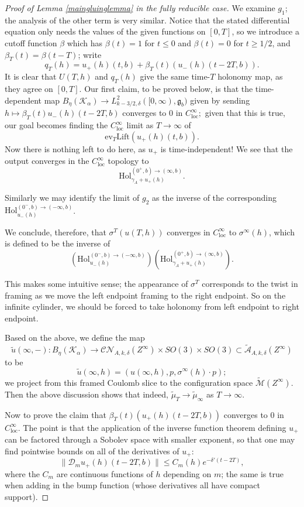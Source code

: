 \documentclass{memo-l}
\theoremstyle{definition}
\theoremstyle{remark}
\numberwithin{section}{chapter}
\numberwithin{equation}{chapter}
\begin{document}
\begin{proof}[Proof of Lemma \ref{maingluinglemma} in the fully reducible case]
We examine $g_1$; the analysis of the other term is very similar. Notice that the stated differential equation only needs the values of the given functions on $[0,T]$, so we introduce a cutoff function $\beta$ which has $\beta(t) = 1$ for $t \leq 0$ and $\beta(t) = 0$ for $t \geq 1/2$, and $\beta_T(t) = \beta(t-T)$; write $$q_T(h) = u_+(h)(t,b) + \beta_T(t)\left(u_-(h)(t - 2T, b)\right).$$ It is clear that $U(T,h)$ and $q_T(h)$ give the same time-$T$ holonomy map, as they agree on $[0,T]$. Our first claim, to be proved below, is that the time-dependent map $B_\eta(\mathcal K_\alpha) \to L^2_{k-3/2, \delta}([0,\infty), \mathfrak g_b)$ given by sending $h \mapsto \beta_T(t) u_-(h)(t-2T, b)$ converges to $0$ in $C^\infty_{\text{loc}};$ given that this is true, our goal becomes finding the $C^\infty_{\text{loc}}$ limit as $T \to \infty$ of $$\text{ev}_{T}\text{Lift}\left(u_+(h)(t,b)\right).$$ Now there is nothing left to do here, as $u_+$ is time-independent! We see that the output converges in the $C^\infty_{\text{loc}}$ topology to $$\text{Hol}^{(0^+, b) \to (\infty, b)}_{\gamma_A + u_+(h)}.$$

Similarly we may identify the limit of $g_2$ as the inverse of the corresponding $\text{Hol}^{(0^-,b) \to (-\infty,b)}_{u_-(h)}$.

We conclude, therefore, that $\sigma^T(u(T,h))$ converges in $C^\infty_{\text{loc}}$ to $\sigma^\infty(h)$, which is defined to be the inverse of $$\left(\text{Hol}^{(0^-,b) \to (-\infty,b)}_{u_-(h)}\right) \left(\text{Hol}^{(0^+, b) \to (\infty, b)}_{\gamma_A + u_+(h)}\right).$$

This makes some intuitive sense; the appearance of $\sigma^T$ corresponds to the twist in framing as we move the left endpoint framing to the right endpoint. So on the infinite cylinder, we should be forced to take holonomy from left endpoint to right endpoint.

Based on the above, we define the map $$\widetilde u(\infty, -): B_\eta(\mathcal K_\alpha) \to \mathcal{CN}_{A,k,\delta}(Z^\infty) \times SO(3) \times SO(3) \subset \widetilde{\mathcal A}_{A,k,\delta}(Z^\infty)$$ to be $$\widetilde u(\infty, h) = (u(\infty, h), p, \sigma^\infty(h) \cdot p);$$ we project from this framed Coulomb slice to the configuration space $\widetilde{\mathcal M}(Z^\infty)$. Then the above discussion shows that indeed, $\widetilde{\mu}_T \to \widetilde{\mu}_\infty$ as $T \to \infty$.

Now to prove the claim that $\beta_T(t)\left(u_+(h)(t-2T, b)\right)$ converges to $0$ in $C^\infty_{\text{loc}}$. The point is that the application of the inverse function theorem defining $u_+$ can be factored through a Sobolev space with smaller exponent, so that one may find pointwise bounds on all of the derivatives of $u_+$: $$\|\mathcal D_m u_+(h)(t-2T, b)\| \leq C_m(h) e^{-\delta'(t-2T)},$$ where the $C_m$ are continuous functions of $h$ depending on $m$; the same is true when adding in the bump function (whose derivatives all have compact support).


\end{proof}
\end{document}
